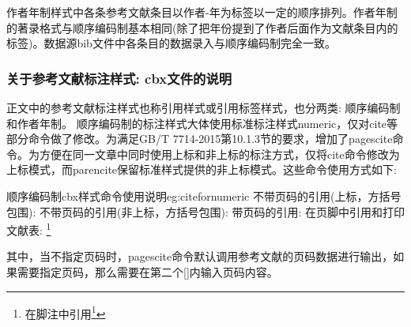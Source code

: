 作者年制样式中各条参考文献条目以作者-年为标签以一定的顺序排列。作者年制的著录格式与顺序编码制基本相同(除了把年份提到了作者后面作为文献条目内的标签)。数据源bib文件中各条目的数据录入与顺序编码制完全一致。



\subsubsection{关于参考文献标注样式: cbx文件的说明}\label{sec:cbx:usage}
正文中的参考文献标注样式也称引用样式或引用标签样式，也分两类: 顺序编码制和作者年制。
顺序编码制的标注样式大体使用标准标注样式numeric，仅对cite等部分命令做了修改。为满足GB/T 7714-2015第10.1.3节的要求，增加了pagescite命令。为方便在同一文章中同时使用上标和非上标的标注方式，仅将cite命令修改为上标模式，而parencite保留标准样式提供的非上标模式。这些命令使用方式如下:

\begin{codetex}{顺序编码制cbx样式命令使用说明}{eg:citefornumeric}
不带页码的引用(上标，方括号包围):
    \cite{Peebles2001-100-100}
不带页码的引用(非上标，方括号包围):
    \parencite{Miroslav2004--}
带页码的引用:
    \cite[见][49页]{蔡敏2006--}  \parencite[见][49页]{Miroslav2004--}
      
在页脚中引用和打印文献表:
    \footnote{在脚注中引用\footcite{赵学功2001--}}  
\end{codetex}

其中，当不指定页码时，pagescite命令默认调用参考文献的页码数据进行输出，如果需要指定页码，那么需要在第二个[]内输入页码内容。

